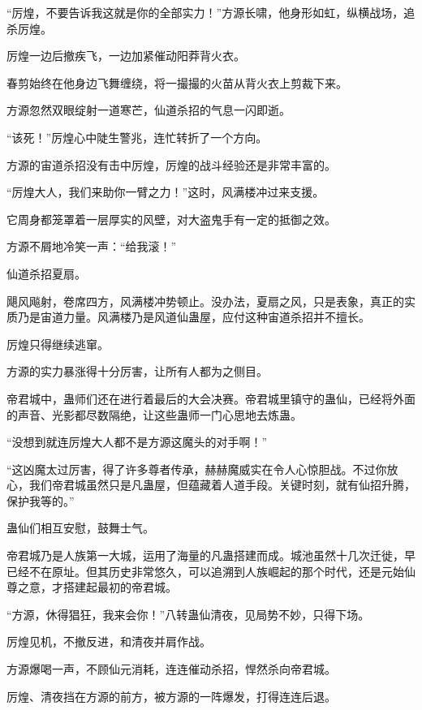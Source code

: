 
\begin{this_body}

“厉煌，不要告诉我这就是你的全部实力！”方源长啸，他身形如虹，纵横战场，追杀厉煌。

厉煌一边后撤疾飞，一边加紧催动阳莽背火衣。

春剪始终在他身边飞舞缠绕，将一撮撮的火苗从背火衣上剪裁下来。

方源忽然双眼绽射一道寒芒，仙道杀招的气息一闪即逝。

“该死！”厉煌心中陡生警兆，连忙转折了一个方向。

方源的宙道杀招没有击中厉煌，厉煌的战斗经验还是非常丰富的。

“厉煌大人，我们来助你一臂之力！”这时，风满楼冲过来支援。

它周身都笼罩着一层厚实的风壁，对大盗鬼手有一定的抵御之效。

方源不屑地冷笑一声：“给我滚！”

仙道杀招夏扇。

飓风飚射，卷席四方，风满楼冲势顿止。没办法，夏扇之风，只是表象，真正的实质乃是宙道力量。风满楼乃是风道仙蛊屋，应付这种宙道杀招并不擅长。

厉煌只得继续逃窜。

方源的实力暴涨得十分厉害，让所有人都为之侧目。

帝君城中，蛊师们还在进行着最后的大会决赛。帝君城里镇守的蛊仙，已经将外面的声音、光影都尽数隔绝，让这些蛊师一门心思地去炼蛊。

“没想到就连厉煌大人都不是方源这魔头的对手啊！”

“这凶魔太过厉害，得了许多尊者传承，赫赫魔威实在令人心惊胆战。不过你放心，我们帝君城虽然只是凡蛊屋，但蕴藏着人道手段。关键时刻，就有仙招升腾，保护我等的。”

蛊仙们相互安慰，鼓舞士气。

帝君城乃是人族第一大城，运用了海量的凡蛊搭建而成。城池虽然十几次迁徙，早已经不在原址。但其历史非常悠久，可以追溯到人族崛起的那个时代，还是元始仙尊之意，才搭建起最初的帝君城。

“方源，休得猖狂，我来会你！”八转蛊仙清夜，见局势不妙，只得下场。

厉煌见机，不撤反进，和清夜并肩作战。

方源爆喝一声，不顾仙元消耗，连连催动杀招，悍然杀向帝君城。

厉煌、清夜挡在方源的前方，被方源的一阵爆发，打得连连后退。


\end{this_body}
